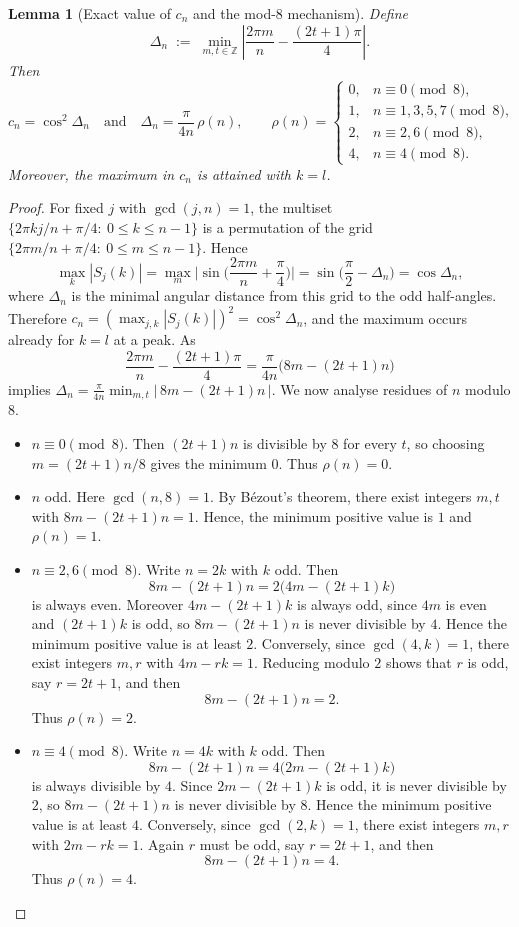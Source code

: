 \documentclass[12pt,fleqn]{amsart}
\renewcommand{\le}{\leqslant}
\newtheorem{lem}[thm]{Lemma}
\theoremstyle{remark}
\newcommand{\1}{\mathbf{1}}
\begin{document}
\begin{lem}[Exact value of $c_n$ and the mod-$8$ mechanism]\label{lem:cn}
Define
\[
\Delta_n \;:=\; \min_{m,t\in\mathbb Z}\left|\frac{2\pi m}{n}-\frac{(2t+1)\pi}{4}\right|.
\]
Then
\[
c_n=\cos^2\Delta_n
\quad\text{and}\quad
\Delta_n=\frac{\pi}{4n}\,\rho(n),
\qquad
\rho(n)=
\begin{cases}
0,& n\equiv0\pmod{8},\\
1,& n\equiv1,3,5,7\pmod{8},\\
2,& n\equiv2,6\pmod{8},\\
4,& n\equiv4\pmod{8}.
\end{cases}
\]
Moreover, the maximum in $c_n$ is attained with $k=l$.
\end{lem}

\begin{proof}
For fixed $j$ with $\gcd(j,n)=1$, the multiset $\{2\pi kj/n+\pi/4:\ 0\le k\le n-1\}$ is a permutation of the grid $\{2\pi m/n+\pi/4:\ 0\le m\le n-1\}$. Hence
\[
\max_k|S_j(k)|=\max_m\Big|\sin\Big(\frac{2\pi m}{n}+\frac{\pi}{4}\Big)\Big|
=\sin\!\Big(\frac{\pi}{2}-\Delta_n\Big)=\cos\Delta_n,
\]
where $\Delta_n$ is the minimal angular distance from this grid to the odd half-angles. Therefore $c_n=(\max_{j,k}|S_j(k)|)^2=\cos^2\Delta_n$, and the maximum occurs already for $k=l$ at a peak. As
\[
\frac{2\pi m}{n}-\frac{(2t+1)\pi}{4}=\frac{\pi}{4n}\big(8m-(2t+1)n\big)
\]
implies $\Delta_n=\tfrac{\pi}{4n}\min_{m,t}|\,8m-(2t+1)n\,|$. We now analyse residues of $n$ modulo $8$.
\begin{itemize}
\item {$n\equiv0\pmod 8$.}
Then $(2t+1)n$ is divisible by $8$ for every $t$, so choosing $m=(2t+1)n/8$ gives the minimum $0$. Thus $\rho(n)=0$.

\item {$n$ odd.}
Here $\gcd(n,8)=1$. By Bézout's theorem, there exist integers $m,t$ with $8m-(2t+1)n=1$. Hence, the minimum positive value is $1$ and $\rho(n)=1$.

\item {$n\equiv 2,6\pmod 8$.}
Write $n=2k$ with $k$ odd. Then
\[
8m-(2t+1)n = 2\bigl(4m-(2t+1)k\bigr)
\]
is always even. Moreover $4m-(2t+1)k$ is always odd, since $4m$ is even and $(2t+1)k$ is odd, so $8m-(2t+1)n$ is never divisible by $4$. Hence the minimum positive value is at least $2$. Conversely, since $\gcd(4,k)=1$, there exist integers $m,r$ with $4m-rk=1$. Reducing modulo $2$ shows that $r$ is odd, say $r=2t+1$, and then
\[
8m-(2t+1)n = 2.
\]
Thus $\rho(n)=2$.

\item {$n\equiv4\pmod 8$.}
Write $n=4k$ with $k$ odd. Then
\[
8m-(2t+1)n = 4\bigl(2m-(2t+1)k\bigr)
\]
is always divisible by $4$. Since $2m-(2t+1)k$ is odd, it is never divisible by $2$, so $8m-(2t+1)n$ is never divisible by $8$. Hence the minimum positive value is at least $4$. Conversely, since $\gcd(2,k)=1$, there exist integers $m,r$ with $2m-rk=1$. Again $r$ must be odd, say $r=2t+1$, and then
\[
8m-(2t+1)n = 4.
\]
Thus $\rho(n)=4$.
\end{itemize}
\end{proof}
\end{document}
